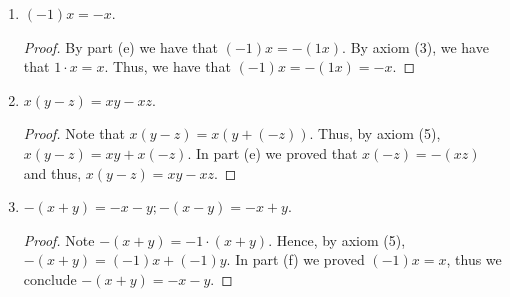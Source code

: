 \documentclass[12pt]{article}
\begin{document}
\begin{enumerate}[label=(\alph*)]
\begin{proof}
			For the second equality, $-(xy) = (-x)y$, we follow an analogous argument by looking at
			the expression $xy + (-x)y$ and note that it is equivalent to $0$. Thus, we conclude 
			that $-(xy) = (-x)y$.
		\end{proof}
		\item $(-1)x = -x.$
		\begin{proof}
			By part (e) we have that $(-1)x = -(1x)$. By axiom (3), we have that $1 \cdot x = x$.
			Thus, we have that $(-1)x = -(1x) = -x$.
		\end{proof}
		\item $x(y - z) = xy - xz$.
		\begin{proof}
			Note that $x(y - z) = x(y + (-z))$. Thus, by axiom (5), $x(y - z) = xy + x(-z)$.
			In part (e) we proved that $x(-z) = -(xz)$ and thus, $x(y - z) = xy - xz$.
		\end{proof}
		\item $-(x + y) = -x -y; -(x - y) = -x + y$.
		\begin{proof}
			Note $-(x + y) = -1 \cdot (x + y)$. Hence, by axiom (5), $-(x + y) = (-1)x + (-1)y$. In
			part (f) we proved $(-1)x = x$, thus we conclude $-(x + y) = -x - y$.
			

\end{proof}
\end{enumerate}
\end{document}
